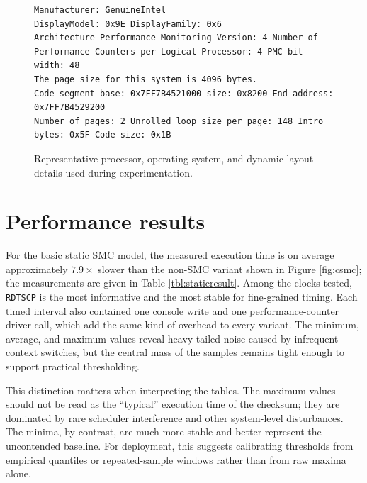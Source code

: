 \documentclass[11pt]{article}
\begin{document}
\begin{figure}[t]
\centering
\begin{lstlisting}
Manufacturer: GenuineIntel
DisplayModel: 0x9E DisplayFamily: 0x6
Architecture Performance Monitoring Version: 4 Number of Performance Counters per Logical Processor: 4 PMC bit width: 48
The page size for this system is 4096 bytes.
Code segment base: 0x7FF7B4521000 size: 0x8200 End address: 0x7FF7B4529200
Number of pages: 2 Unrolled loop size per page: 148 Intro bytes: 0x5F Code size: 0x1B
\end{lstlisting}
\caption{Representative processor, operating-system, and dynamic-layout details used during experimentation.}
\label{fig:expsetup}
\end{figure}

\section{Performance results}\label{sec:performance}

For the basic static SMC model, the measured execution time is on average
approximately $7.9\times$ slower than the non-SMC variant shown in Figure
\ref{fig:csmc}; the measurements are given in Table \ref{tbl:staticresult}.
Among the clocks tested, \texttt{RDTSCP} is the most informative and the most
stable for fine-grained timing.  Each timed interval also contained one console write and one performance-counter driver call, which add the same kind of overhead to every variant.  The minimum, average, and maximum values reveal
heavy-tailed noise caused by infrequent context switches, but the central mass of
the samples remains tight enough to support practical thresholding.

This distinction matters when interpreting the tables.  The maximum values should
not be read as the ``typical'' execution time of the checksum; they are dominated
by rare scheduler interference and other system-level disturbances.  The minima,
by contrast, are much more stable and better represent the uncontended baseline.
For deployment, this suggests calibrating thresholds from empirical quantiles or
repeated-sample windows rather than from raw maxima alone.
\end{document}

